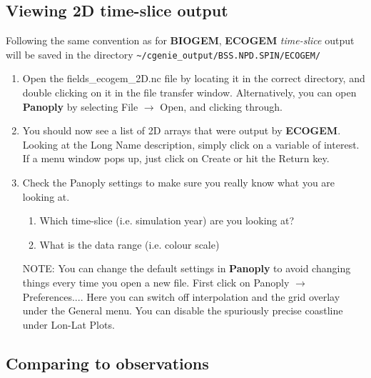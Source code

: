 \documentclass[11pt,fleqn]{book} %
\begin{document}
\subsection{Viewing 2D time-slice output} 

Following the same convention as for \textbf{BIOGEM}, \textbf{ECOGEM} \textit{time-slice} output will be saved in the directory \texttt{\textasciitilde{}/cgenie\_output/BSS.NPD.SPIN/ECOGEM/}

\vspace{2mm}
\begin{enumerate}[noitemsep]

\item Open the \textsf{\small fields\_ecogem\_2D.nc} file by locating it in the correct directory, and double clicking on it in the file transfer window. Alternatively, you can open \textbf{Panoply} by selecting \textsf{\small File} $\rightarrow$ \textsf{\small Open}, and clicking through.

\item You should now see a list of 2D arrays that were output by \textbf{ECOGEM}. Looking at the \textsf{\small Long Name} description, simply click on a variable of interest. If a menu window pops up, just click on \textsf{\small Create} or hit the \textsf{\small Return} key.

\item Check the Panoply settings to make sure you really know what you are looking at.
\begin{enumerate}[noitemsep]
\item Which time-slice (i.e. simulation year) are you looking at?
\item What is the data range (i.e. colour scale)
\end{enumerate}

\item[NOTE:] You can change the default settings in \textbf{Panoply} to avoid changing things every time you open a new file. First click on \textsf{\small Panoply} $\rightarrow$ \textsf{\small Preferences...}. Here you can switch off interpolation and the grid overlay under the \textsf{\small General} menu. You can disable the spuriously precise coastline under \textsf{\small Lon-Lat Plots}.

\end{enumerate}
\vspace{2mm}


\subsection{Comparing to observations} 
\end{document}
